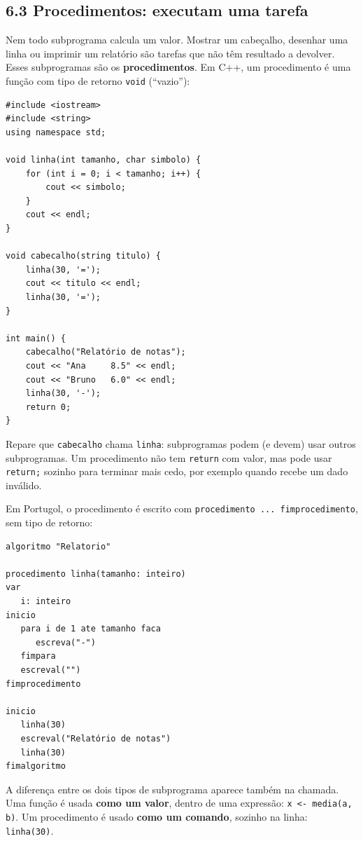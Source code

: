 \subsection{6.3 Procedimentos: executam uma tarefa}

Nem todo subprograma calcula um valor. Mostrar um cabeçalho, desenhar uma linha ou imprimir um relatório são tarefas que não têm resultado a devolver. Esses subprogramas são os \textbf{procedimentos}. Em C++, um procedimento é uma função com tipo de retorno \texttt{void} (``vazio''):

\begin{codigo}
\begin{Verbatim}[breaklines=true, breaksymbolleft={}, fontsize=\footnotesize]
#include <iostream>
#include <string>
using namespace std;

void linha(int tamanho, char simbolo) {
    for (int i = 0; i < tamanho; i++) {
        cout << simbolo;
    }
    cout << endl;
}

void cabecalho(string titulo) {
    linha(30, '=');
    cout << titulo << endl;
    linha(30, '=');
}

int main() {
    cabecalho("Relatório de notas");
    cout << "Ana     8.5" << endl;
    cout << "Bruno   6.0" << endl;
    linha(30, '-');
    return 0;
}
\end{Verbatim}
\end{codigo}

Repare que \texttt{cabecalho} chama \texttt{linha}: subprogramas podem (e devem) usar outros subprogramas. Um procedimento não tem \texttt{return} com valor, mas pode usar \texttt{return;} sozinho para terminar mais cedo, por exemplo quando recebe um dado inválido.

Em Portugol, o procedimento é escrito com \texttt{procedimento ... fimprocedimento}, sem tipo de retorno:

\begin{codigo}
\begin{Verbatim}[breaklines=true, breaksymbolleft={}, fontsize=\footnotesize]
algoritmo "Relatorio"

procedimento linha(tamanho: inteiro)
var
   i: inteiro
inicio
   para i de 1 ate tamanho faca
      escreva("-")
   fimpara
   escreval("")
fimprocedimento

inicio
   linha(30)
   escreval("Relatório de notas")
   linha(30)
fimalgoritmo
\end{Verbatim}
\end{codigo}

A diferença entre os dois tipos de subprograma aparece também na chamada. Uma função é usada \textbf{como um valor}, dentro de uma expressão: \texttt{x <- media(a, b)}. Um procedimento é usado \textbf{como um comando}, sozinho na linha: \texttt{linha(30)}.

